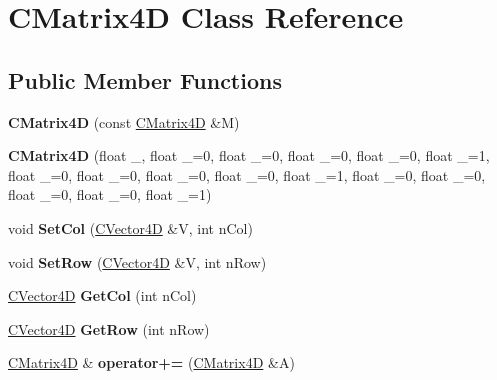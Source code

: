 \hypertarget{class_c_matrix4_d}{}\section{C\+Matrix4D Class Reference}
\label{class_c_matrix4_d}
\subsection*{Public Member Functions}
\begin{DoxyCompactItemize}
\item 
{\bfseries C\+Matrix4D} (const \hyperlink{class_c_matrix4_d}{C\+Matrix4D} \&M)\hypertarget{class_c_matrix4_d_a44bfdaf73313da7ada7eccffdc186186}{}\label{class_c_matrix4_d_a44bfdaf73313da7ada7eccffdc186186}

\item 
{\bfseries C\+Matrix4D} (float \+\_, float \+\_=0, float \+\_=0, float \+\_=0, float \+\_=0, float \+\_=1, float \+\_=0, float \+\_=0, float \+\_=0, float \+\_=0, float \+\_=1, float \+\_=0, float \+\_=0, float \+\_=0, float \+\_=0, float \+\_=1)\hypertarget{class_c_matrix4_d_a1b815cfad92b3df7201475c9d6858887}{}\label{class_c_matrix4_d_a1b815cfad92b3df7201475c9d6858887}

\item 
void {\bfseries Set\+Col} (\hyperlink{struct_c_vector4_d}{C\+Vector4D} \&V, int n\+Col)\hypertarget{class_c_matrix4_d_aa2c2522c59b52421f22d1d48beabb1ed}{}\label{class_c_matrix4_d_aa2c2522c59b52421f22d1d48beabb1ed}

\item 
void {\bfseries Set\+Row} (\hyperlink{struct_c_vector4_d}{C\+Vector4D} \&V, int n\+Row)\hypertarget{class_c_matrix4_d_a6f1fd92a2079a61de43afd8ea0746c39}{}\label{class_c_matrix4_d_a6f1fd92a2079a61de43afd8ea0746c39}

\item 
\hyperlink{struct_c_vector4_d}{C\+Vector4D} {\bfseries Get\+Col} (int n\+Col)\hypertarget{class_c_matrix4_d_a4861c5e053c169c9ffc299e15b6d1de3}{}\label{class_c_matrix4_d_a4861c5e053c169c9ffc299e15b6d1de3}

\item 
\hyperlink{struct_c_vector4_d}{C\+Vector4D} {\bfseries Get\+Row} (int n\+Row)\hypertarget{class_c_matrix4_d_ad3ad1b5fbf9bba47f7fac93ba854b4b5}{}\label{class_c_matrix4_d_ad3ad1b5fbf9bba47f7fac93ba854b4b5}

\item 
\hyperlink{class_c_matrix4_d}{C\+Matrix4D} \& {\bfseries operator+=} (\hyperlink{class_c_matrix4_d}{C\+Matrix4D} \&A)\hypertarget{class_c_matrix4_d_a5ed9a0fcc351ae1002c38a22af028b17}{}\label{class_c_matrix4_d_a5ed9a0fcc351ae1002c38a22af028b17}


\end{DoxyCompactItemize}
